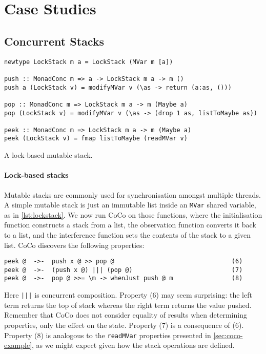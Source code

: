 \section{Case Studies}
\label{sec:coco-cases}

\subsection*{Concurrent Stacks}
\label{sec:coco-cases-stack}

\begin{listing}
\begin{verbatim}
newtype LockStack m a = LockStack (MVar m [a])

push :: MonadConc m => a -> LockStack m a -> m ()
push a (LockStack v) = modifyMVar v (\as -> return (a:as, ()))

pop :: MonadConc m => LockStack m a -> m (Maybe a)
pop (LockStack v) = modifyMVar v (\as -> (drop 1 as, listToMaybe as))

peek :: MonadConc m => LockStack m a -> m (Maybe a)
peek (LockStack v) = fmap listToMaybe (readMVar v)
\end{verbatim}
\caption{A lock-based mutable stack.}
\label{lst:lockstack}
\end{listing}

\paragraph{Lock-based stacks}
Mutable stacks are commonly used for synchronisation amongst multiple
threads.  A simple mutable stack is just an immutable list inside an
\verb|MVar| shared variable, as in \cref{lst:lockstack}.  We now run
CoCo on those functions, where the initialisation function constructs
a stack from a list, the observation function converts it back to a
list, and the interference function sets the contents of the stack to
a given list.  CoCo discovers the following properties:

\begin{verbatim}
peek @  ->-  push x @ >> pop @                                (6)
peek @  ->-  (push x @) ||| (pop @)                           (7)
peek @  ->-  pop @ >>= \m -> whenJust push @ m                (8)
\end{verbatim}

\noindent
Here \verb#|||# is concurrent composition.  Property (6) may seem
surprising: the left term returns the top of stack whereas the right
term returns the value pushed.  Remember that CoCo does not consider
equality of results when determining properties, only the effect on
the state.  Property (7) is a consequence of (6).  Property (8) is
analogous to the \verb|readMVar| properties presented in
\cref{sec:coco-example}, as we might expect given how the stack
operations are defined.

